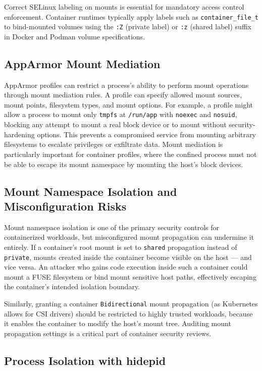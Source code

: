 \begin{securitybox}
Correct SELinux labeling on mounts is essential for mandatory access control enforcement. Container runtimes typically apply labels such as \texttt{container\_file\_t} to bind-mounted volumes using the \texttt{:Z} (private label) or \texttt{:z} (shared label) suffix in Docker and Podman volume specifications.

\subsection*{AppArmor Mount Mediation}

AppArmor profiles can restrict a process's ability to perform mount operations through mount mediation rules. A profile can specify allowed mount sources, mount points, filesystem types, and mount options. For example, a profile might allow a process to mount only \texttt{tmpfs} at \texttt{/run/app} with \texttt{noexec} and \texttt{nosuid}, blocking any attempt to mount a real block device or to mount without security-hardening options. This prevents a compromised service from mounting arbitrary filesystems to escalate privileges or exfiltrate data. Mount mediation is particularly important for container profiles, where the confined process must not be able to escape its mount namespace by mounting the host's block devices.

\subsection*{Mount Namespace Isolation and Misconfiguration Risks}

Mount namespace isolation is one of the primary security controls for containerized workloads, but misconfigured mount propagation can undermine it entirely. If a container's root mount is set to \texttt{shared} propagation instead of \texttt{private}, mounts created inside the container become visible on the host --- and vice versa. An attacker who gains code execution inside such a container could mount a FUSE filesystem or bind mount sensitive host paths, effectively escaping the container's intended isolation boundary.

Similarly, granting a container \texttt{Bidirectional} mount propagation (as Kubernetes allows for CSI drivers) should be restricted to highly trusted workloads, because it enables the container to modify the host's mount tree. Auditing mount propagation settings is a critical part of container security reviews.

\subsection*{Process Isolation with hidepid}


\end{securitybox}
